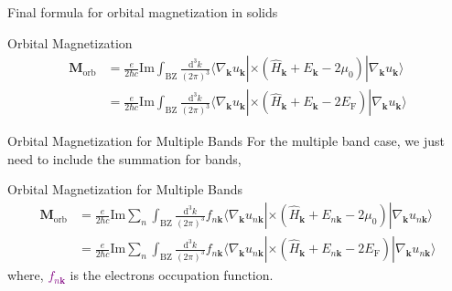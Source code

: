 \documentclass{beamer}
\newcommand{\purple}{\textcolor{purple}}
\begin{document}

    \begin{frame}{Final formula for orbital magnetization in solids}\small
      \begin{block}{Orbital Magnetization}
        \begin{subequations}\begin{align}
          \bm{M}_{\text{orb}} &= \frac{e}{2\hbar{}c}\text{Im}\int_{\text{BZ}}\frac{\mathrm{d}^3k}{(2\pi)^3}\langle\nabla_{\bm{k}}u_{\bm{k}}|\times(\widehat{H}_{\bm{k}}+E_{\bm{k}}-2\mu_{0})|\nabla_{\bm{k}}u_{\bm{k}}\rangle\\
          &= \frac{e}{2\hbar{}c}\text{Im}\int_{\text{BZ}}\frac{\mathrm{d}^3k}{(2\pi)^3}\langle\nabla_{\bm{k}}u_{\bm{k}}|\times(\widehat{H}_{\bm{k}}+E_{\bm{k}}-2E_{\text{F}})|\nabla_{\bm{k}}u_{\bm{k}}\rangle
        \end{align}\end{subequations}
      \end{block}
    \end{frame}

    \begin{frame}{Orbital Magnetization for Multiple Bands}\small
      For the multiple band case, we just need to include the summation for bands,
      \begin{block}{Orbital Magnetization for Multiple Bands}
        \begin{subequations}\begin{align}
          \bm{M}_{\text{orb}} &= \frac{e}{2\hbar{}c}\text{Im}\sum_n\int_{\text{BZ}}\frac{\mathrm{d}^3k}{(2\pi)^3}f_{n\bm{k}}\langle\nabla_{\bm{k}}u_{n\bm{k}}|\times(\widehat{H}_{\bm{k}}+E_{n\bm{k}}-2\mu_{0})|\nabla_{\bm{k}}u_{n\bm{k}}\rangle\\
          &= \frac{e}{2\hbar{}c}\text{Im}\sum_n\int_{\text{BZ}}\frac{\mathrm{d}^3k}{(2\pi)^3}f_{n\bm{k}}\langle\nabla_{\bm{k}}u_{n\bm{k}}|\times(\widehat{H}_{\bm{k}}+E_{n\bm{k}}-2E_{\text{F}})|\nabla_{\bm{k}}u_{n\bm{k}}\rangle
        \end{align}\end{subequations}
        where, \purple{\(f_{n\bm{k}}\)} is the electrons occupation function.
      \end{block}
    \end{frame}
\end{document}
